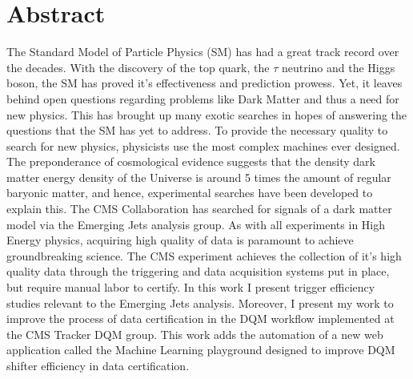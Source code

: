 \chapter*{Abstract}

The Standard Model of Particle Physics (SM) has had a great track record over the decades. With the discovery of the top quark, the $\tau$ neutrino and the Higgs boson, the SM has proved it's effectiveness and prediction prowess. Yet, it leaves behind open questions regarding problems like Dark Matter and thus a need for new physics. This has brought up many exotic searches in hopes of answering the questions that the SM has yet to address.
To provide the necessary quality to search for new physics, physicists use the most complex machines ever designed.
The preponderance of cosmological evidence suggests that the density dark matter energy density of the Universe is around 5 times the amount of regular baryonic matter, and hence, experimental searches have been developed to explain this.
The CMS Collaboration has searched for signals of a dark matter model via the Emerging Jets analysis group.
As with all experiments in High Energy physics, acquiring high quality of data is paramount to achieve groundbreaking science. The CMS experiment achieves the collection of it's high quality data through the triggering and data acquisition systems put in place, but require manual labor to certify.
In this work I present trigger efficiency studies relevant to the Emerging Jets analysis. Moreover, I present my work
to improve the process of data certification in the DQM workflow implemented at the CMS Tracker DQM group. This work adds the automation of a new web application called the Machine Learning playground designed to improve DQM shifter efficiency in data certification.



